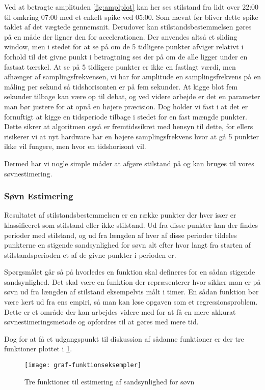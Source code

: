 Ved at betragte amplituden \cref{fig:amplplot} kan her ses stilstand fra lidt over 22:00 til omkring 07:00 med et enkelt spike ved 05:00.
Som nævnt før bliver dette spike taklet af det vægtede gennemsnit.
Derudover kan stilstandsbestemmelsen gøres på en måde der ligner den for accelerationen.
Der anvendes altså et sliding window, men i stedet for at se på om de 5 tidligere punkter afviger relativt i forhold til det givne punkt i betragtning ses der på om de alle ligger under en fastsat tærskel.
At se på 5 tidligere punkter er ikke en fastlagt værdi, men afhænger af samplingsfrekvensen, vi har for amplitude en samplingsfrekvens på en måling per sekund så tidshorisonten er på fem sekunder.
At kigge blot fem sekunder tilbage kan være op til debat, og ved videre arbejde er det en parameter man bør justere for at opnå en højere præcision.
Dog holder vi fast i at det er fornuftigt at kigge en tidsperiode tilbage i stedet for en fast mængde punkter.
Dette sikrer at algoritmen også er fremtidssikret med hensyn til dette, for ellers risikerer vi at nyt hardware har en højere samplingsfrekvens hvor at gå 5 punkter ikke vil fungere, men hvor en tidshorisont vil.

Dermed har vi nogle simple måder at afgøre stilstand på og kan bruges til vores søvnestimering.

\subsubsection{Søvn Estimering}
Resultatet af stilstandsbestemmelsen er en række punkter der hver især er klassificeret som stilstand eller ikke stilstand.
Ud fra disse punkter kan der findes perioder med stilstand, og ud fra længden af hver af disse perioder tildeles punkterne en stigende sandsynlighed for søvn alt efter hvor langt fra starten af stilstandsperioden et af de givne punkter i perioden er.

Spørgsmålet går så på hvorledes en funktion skal defineres for en sådan stigende sandsynlighed.
Det skal være en funktion der repræsenterer hvor sikker man er på søvn ud fra længden af stilstand eksempelvis målt i timer.
En sådan funktion bør være lært ud fra ens empiri, så man kan løse opgaven som et regressionsproblem.
Dette er et område der kan arbejdes videre med for at få en mere akkurat søvnestimeringsmetode og opfordres til at gøres med mere tid.

Dog for at få et udgangspunkt til diskussion af sådanne funktioner er der tre funktioner plottet i \cref{fig:trefunc}.
\begin{figure}[h]
	\centering
	\texttt{[image: graf-funktionseksempler]}
	\caption{Tre funktioner til estimering af sandsynlighed for søvn}\label{fig:trefunc}
\end{figure}

